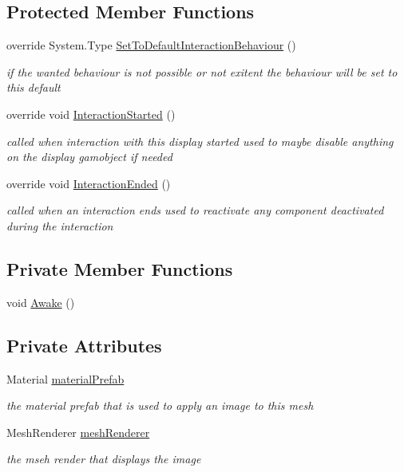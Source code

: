 \subsection*{Protected Member Functions}
\begin{DoxyCompactItemize}
\item 
override System.\+Type \mbox{\hyperlink{class_image_display_ae975595939d76dd1db32e6f029f53ab6}{Set\+To\+Default\+Interaction\+Behaviour}} ()
\begin{DoxyCompactList}\small\item\em if the wanted behaviour is not possible or not exitent the behaviour will be set to this default \end{DoxyCompactList}\item 
override void \mbox{\hyperlink{class_image_display_a1fdf91b09cd5329059d38033f1330ffb}{Interaction\+Started}} ()
\begin{DoxyCompactList}\small\item\em called when interaction with this display started used to maybe disable anything on the display gamobject if needed \end{DoxyCompactList}\item 
override void \mbox{\hyperlink{class_image_display_a94c5928ef81449c37740d0bd0a8f4062}{Interaction\+Ended}} ()
\begin{DoxyCompactList}\small\item\em called when an interaction ends used to reactivate any component deactivated during the interaction \end{DoxyCompactList}\end{DoxyCompactItemize}
\subsection*{Private Member Functions}
\begin{DoxyCompactItemize}
\item 
void \mbox{\hyperlink{class_image_display_a3dfa32d33641e56a6623265150b8ddba}{Awake}} ()
\end{DoxyCompactItemize}
\subsection*{Private Attributes}
\begin{DoxyCompactItemize}
\item 
Material \mbox{\hyperlink{class_image_display_a19b3e5d9b9fba307ab9f4529808b7768}{material\+Prefab}}
\begin{DoxyCompactList}\small\item\em the material prefab that is used to apply an image to this mesh \end{DoxyCompactList}\item 
Mesh\+Renderer \mbox{\hyperlink{class_image_display_ab96891e8a9d31e5fd90bff26b8485287}{mesh\+Renderer}}
\begin{DoxyCompactList}\small\item\em the mseh render that displays the image \end{DoxyCompactList}\end{DoxyCompactItemize}
